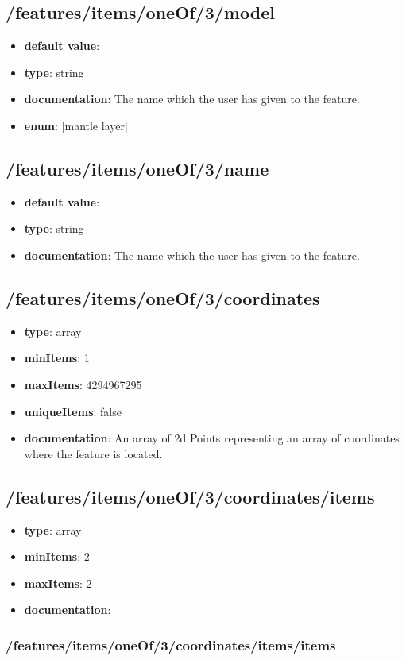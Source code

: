 \subsection{/features/items/oneOf/3/model}
\begin{itemize}\item {\bf default value}: 
\item {\bf type}: string
\item {\bf documentation}: The name which the user has given to the feature.
\item {\bf enum}: [mantle layer]\end{itemize}\subsection{/features/items/oneOf/3/name}
\begin{itemize}\item {\bf default value}: 
\item {\bf type}: string
\item {\bf documentation}: The name which the user has given to the feature.
\end{itemize}\subsection{/features/items/oneOf/3/coordinates}
\begin{itemize}\item {\bf type}: array
\item {\bf minItems}: 1
\item {\bf maxItems}: 4294967295
\item {\bf uniqueItems}: false
\item {\bf documentation}: An array of 2d Points representing an array of coordinates where the feature is located.
\end{itemize}\subsection{/features/items/oneOf/3/coordinates/items}
\begin{itemize}\item {\bf type}: array
\item {\bf minItems}: 2
\item {\bf maxItems}: 2
\item {\bf documentation}: 
\end{itemize}\subsubsection{/features/items/oneOf/3/coordinates/items/items}
